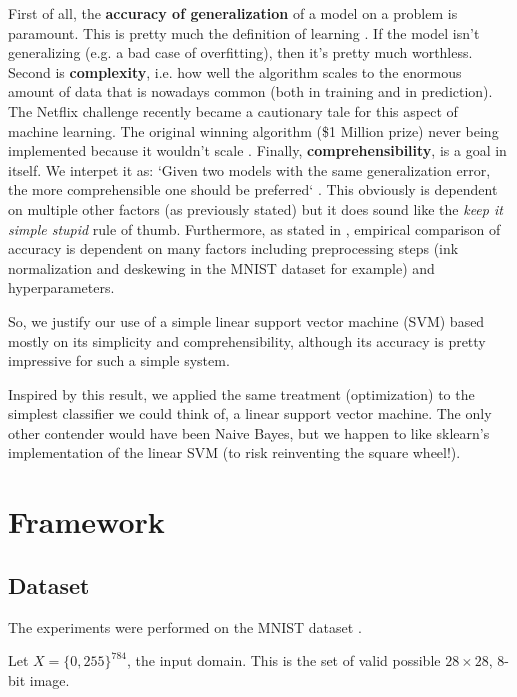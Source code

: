 \documentclass{article} %
\begin{document}
First of all, the \textbf{accuracy of generalization} of a model on a problem
is paramount. This is pretty much the definition of learning
\citep{domingos_few_2012}. If the model isn't generalizing (e.g. a bad case of
overfitting), then it's pretty much worthless.
Second is \textbf{complexity}, i.e. how well the algorithm scales to the
enormous amount of data that is nowadays common (both in training and in
prediction). The Netflix challenge recently became a cautionary tale for this
aspect of machine learning. The original winning algorithm  (\$1 Million prize)
never being implemented because it wouldn't scale
\citep{johnston_netflix_2012}.
Finally, \textbf{comprehensibility}, is a goal in itself. We interpet it as:
`Given two models with the same generalization error, the more comprehensible
one should be preferred` \citep{domingos_role_1999}.
This obviously is dependent on multiple other factors (as previously stated)
but it does sound like the \textit{keep it simple stupid} rule of thumb.
Furthermore, as stated in \citep{hand_classifier_2006}, empirical comparison of
accuracy is dependent on many factors including preprocessing steps (ink
normalization and deskewing in the MNIST dataset for example) and
hyperparameters.

So, we justify our use of a simple linear support vector machine (SVM) based
mostly on its simplicity and comprehensibility, although its accuracy is
pretty impressive for such a simple system.



Inspired by this result, we applied the same treatment (optimization) to the
simplest classifier we could think of, a linear support vector machine. The
only other contender would have been Naive Bayes, but we happen to like
sklearn's implementation of the linear SVM (to risk reinventing the square
wheel!).


\section{Framework}


\subsection{Dataset}

The experiments were performed on the MNIST dataset \citep{lecun_mnist_1998}.

Let \begin{math} X=\{0, 255\}^{784} \end{math}, the input domain.
This is the set of valid possible $28\times28$, 8-bit image.
\end{document}
